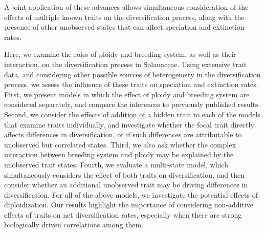 A joint application of these advances allows simultaneous consideration of the effects of multiple known traits on the diversification process, along with the presence of other unobserved states that can affect speciation and extinction rates. 

Here, we examine the roles of ploidy and breeding system, as well as their interaction, on the diversification process in Solanaceae.
Using extensive trait data, and considering other possible sources of heterogeneity in the diversification process, we assess the influence of these traits on speciation and extinction rates.
First, we present models in which the effect of ploidy and breeding system are considered separately, and compare the inferences to previously published results. 
Second, we consider the effects of addition of a hidden trait to each of the models that examine traits individually, and investigate whether the focal trait directly affects differences in diversification, or if such differences are attributable to unobserved but correlated states.
Third, we also ask whether the complex interaction between breeding system and ploidy may be explained by the unobserved trait states. 
Fourth, we evaluate a multi-state model, which simultaneously considers the effect of both traits on diversification, and then consider whether an additional unobserved trait may be driving differences in diversification. 
For all of the above models, we investigate the potential effects of diploidization. 
Our results highlight the importance of considering non-additive effects of traits on net diversification rates, especially when there are strong biologically driven correlations among them.




